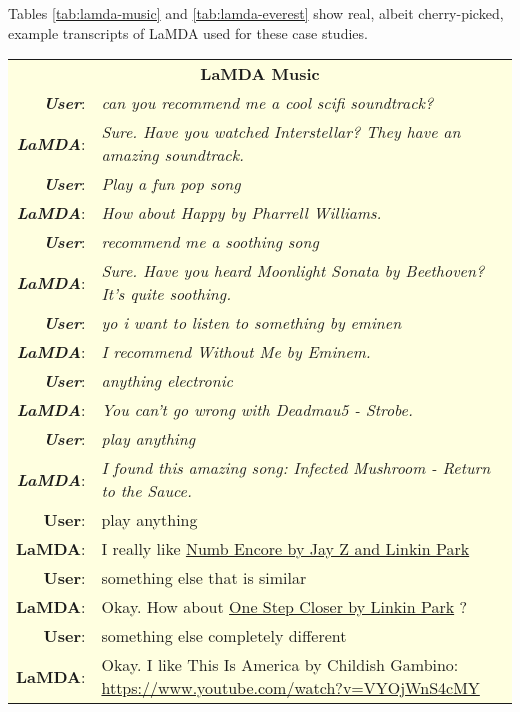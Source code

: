 \documentclass{article}
\begin{document}
Tables \ref{tab:lamda-music} and \ref{tab:lamda-everest} show real, albeit cherry-picked, example transcripts of LaMDA used for these case studies.



\begin{table}[ht!]
\small
\centering
\colorbox{lightyellow}{

\begin{tabular}{rp{12cm}}
\multicolumn{2}{c}{{\bf LaMDA Music}} \\
\textbf{\textit{User}}: & \textit{can you recommend me a cool scifi soundtrack?} \\
\textbf{\textit{LaMDA}}: & \textit{Sure. Have you watched Interstellar? They have an amazing soundtrack.} \\
\textbf{\textit{User}}: & \textit{Play a fun pop song} \\
\textbf{\textit{LaMDA}}: & \textit{How about Happy by Pharrell Williams.} \\
\textbf{\textit{User}}: & \textit{recommend me a soothing song} \\
\textbf{\textit{LaMDA}}: & \textit{Sure. Have you heard Moonlight Sonata by Beethoven? It's quite soothing.} \\
\textbf{\textit{User}}: & \textit{yo i want to listen to something by eminen} \\
\textbf{\textit{LaMDA}}: & \textit{I recommend Without Me by Eminem.} \\
\textbf{\textit{User}}: & \textit{anything electronic} \\
\textbf{\textit{LaMDA}}: & \textit{You can't go wrong with Deadmau5 - Strobe.} \\
\textbf{\textit{User}}: & \textit{play anything} \\
\textbf{\textit{LaMDA}}: & \textit{I found this amazing song: Infected Mushroom - Return to the Sauce.} \\
\textbf{User}: & play anything \\
\textbf{LaMDA}: & I really like  \href{https://www.youtube.com/watch?v=UhQyZFrYNzw)}{Numb Encore by Jay Z and Linkin Park} \\
\textbf{User}: & something else that is similar  \\
\textbf{LaMDA}: & Okay. How about \href{https://www.youtube.com/watch?v=4qlCC1GOwFw}{One Step Closer by Linkin Park} ? \\
\textbf{User}: & something else completely different \\
\textbf{LaMDA}: & Okay. I like This Is America by Childish Gambino: \url{https://www.youtube.com/watch?v=VYOjWnS4cMY} \\

\end{tabular}}
\end{table}
\end{document}
